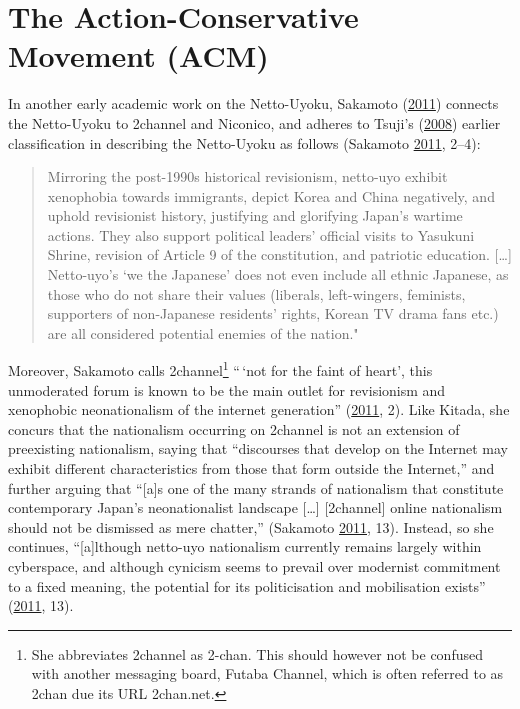 \documentclass[10pt,british,A4paper,twoside]{memoir}
\begin{document}
\section{The Action-Conservative Movement
(ACM)}\label{the-action-conservative-movement-acm}

In another early academic work on the Netto-Uyoku, Sakamoto
(\protect\hyperlink{ref-sakamoto_koreans_2011}{2011}) connects the
Netto-Uyoku to 2channel and Niconico, and adheres to Tsuji's
(\protect\hyperlink{ref-tsuji_eng:_2008}{2008}) earlier classification
in describing the Netto-Uyoku as follows (Sakamoto
\protect\hyperlink{ref-sakamoto_koreans_2011}{2011}, 2--4):

\begin{quote}
Mirroring the post-1990s historical revisionism, netto-uyo exhibit
xenophobia towards immigrants, depict Korea and China negatively, and
uphold revisionist history, justifying and glorifying Japan's wartime
actions. They also support political leaders' official visits to
Yasukuni Shrine, revision of Article 9 of the constitution, and
patriotic education. {[}\ldots{}{]} Netto-uyo's `we the Japanese' does
not even include all ethnic Japanese, as those who do not share their
values (liberals, left-wingers, feminists, supporters of non-Japanese
residents' rights, Korean TV drama fans etc.) are all considered
potential enemies of the nation."
\end{quote}

Moreover, Sakamoto calls 2channel\footnote{She abbreviates 2channel as
  2-chan. This should however not be confused with another messaging
  board, Futaba Channel, which is often referred to as 2chan due its URL
  2chan.net.} ``\,`not for the faint of heart', this unmoderated forum
is known to be the main outlet for revisionism and xenophobic
neonationalism of the internet generation''
(\protect\hyperlink{ref-sakamoto_koreans_2011}{2011}, 2). Like Kitada,
she concurs that the nationalism occurring on 2channel is not an
extension of preexisting nationalism, saying that ``discourses that
develop on the Internet may exhibit different characteristics from those
that form outside the Internet,'' and further arguing that ``{[}a{]}s
one of the many strands of nationalism that constitute contemporary
Japan's neonationalist landscape {[}\ldots{}{]} {[}2channel{]} online
nationalism should not be dismissed as mere chatter,'' (Sakamoto
\protect\hyperlink{ref-sakamoto_koreans_2011}{2011}, 13). Instead, so
she continues, ``{[}a{]}lthough netto-uyo nationalism currently remains
largely within cyberspace, and although cynicism seems to prevail over
modernist commitment to a fixed meaning, the potential for its
politicisation and mobilisation exists''
(\protect\hyperlink{ref-sakamoto_koreans_2011}{2011}, 13).
\end{document}
